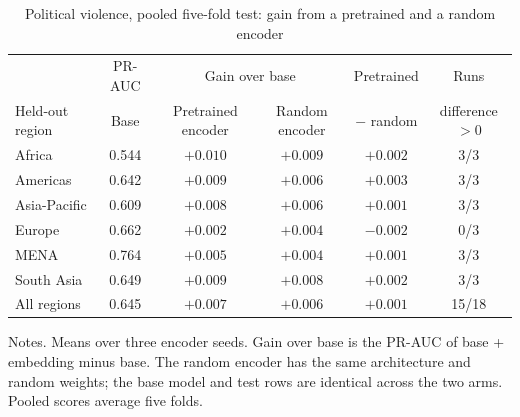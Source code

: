\begin{table}[!htbp]
\centering\footnotesize\setlength{\tabcolsep}{5pt}
\caption{Political violence, pooled five-fold test: gain from a pretrained and a random encoder}
\label{tab:random_pooled}
\begin{tabular}{lccccc}
\hline
 & PR-AUC & \multicolumn{2}{c}{Gain over base} & Pretrained & Runs \\
Held-out region & Base & Pretrained encoder & Random encoder & $-$ random & difference $>0$ \\
\hline
Africa & 0.544 & $+0.010$ & $+0.009$ & $+0.002$ & 3/3 \\
Americas & 0.642 & $+0.009$ & $+0.006$ & $+0.003$ & 3/3 \\
Asia-Pacific & 0.609 & $+0.008$ & $+0.006$ & $+0.001$ & 3/3 \\
Europe & 0.662 & $+0.002$ & $+0.004$ & $-0.002$ & 0/3 \\
MENA & 0.764 & $+0.005$ & $+0.004$ & $+0.001$ & 3/3 \\
South Asia & 0.649 & $+0.009$ & $+0.008$ & $+0.002$ & 3/3 \\
\hline
All regions & 0.645 & $+0.007$ & $+0.006$ & $+0.001$ & 15/18 \\
\hline
\end{tabular}
\begin{minipage}{0.98\textwidth}\footnotesize\vspace{0.5ex}
Notes. Means over three encoder seeds. Gain over base is the PR-AUC of base + embedding minus base. The random encoder has the same architecture and random weights; the base model and test rows are identical across the two arms. Pooled scores average five folds.
\end{minipage}
\end{table}
